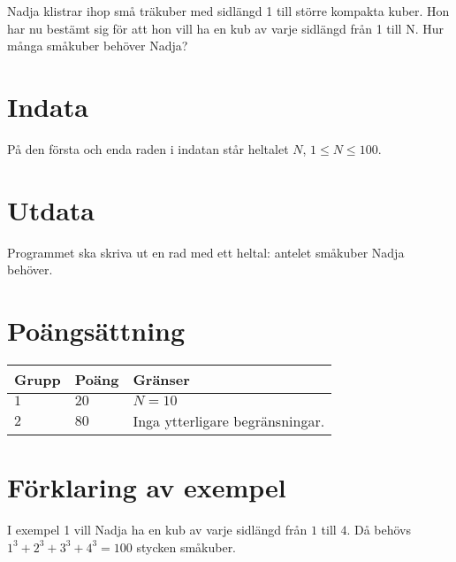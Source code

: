 \noindent

%
Nadja klistrar ihop små träkuber med sidlängd 1 till större kompakta kuber. 
Hon har nu bestämt sig för att hon vill ha en kub av varje sidlängd från 1 till N. 
Hur många småkuber behöver Nadja?

\section*{Indata}
På den första och enda raden i indatan står heltalet $N$, $1 \leq N \leq 100$.

\section*{Utdata}
Programmet ska skriva ut en rad med ett heltal: antelet småkuber Nadja behöver.

\section*{Poängsättning}
\noindent
\begin{tabular}{| l | l | p{12cm} |}
  \hline
  \textbf{Grupp} & \textbf{Poäng} & \textbf{Gränser} \\ \hline
  $1$    & $20$       & $N = 10$ \\ \hline
  $2$    & $80$       & Inga ytterligare begränsningar. \\ \hline
\end{tabular}

\section*{Förklaring av exempel}
I exempel 1 vill Nadja ha en kub av varje sidlängd från $1$ till $4$.
Då behövs $1^3 + 2^3 + 3^3 + 4^3 = 100$ stycken småkuber.
